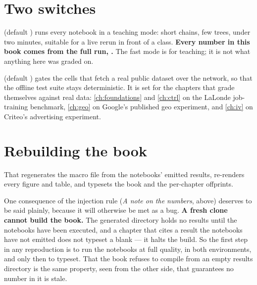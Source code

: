 \section*{Two switches}

 (default ) runs every notebook in a teaching mode: short chains, few
trees, under two minutes, suitable for a live rerun in front of a class. \textbf{Every number in
this book comes from the full run, .} The fast mode is for teaching; it is not
what anything here was graded on.

 (default ) gates the cells that fetch a real public dataset over the
network, so that the offline test suite stays deterministic. It is set for the chapters that grade
themselves against real data: \cref{ch:foundations} and \cref{ch:ctrl} on the LaLonde job-training
benchmark, \cref{ch:geo} on Google's published geo experiment, and \cref{ch:iv} on Criteo's
advertising experiment.

\section*{Rebuilding the book}

\begin{quote}
\end{quote}

That regenerates the macro file from the notebooks' emitted results, re-renders every figure and
table, and typesets the book and the per-chapter offprints.

One consequence of the injection rule (\emph{A note on the numbers}, above) deserves to be said
plainly, because it will otherwise be met as a bug. \textbf{A fresh clone cannot build the book.}
The generated directory holds no results until the notebooks have been executed, and a chapter that
cites a result the notebooks have not emitted does not typeset a blank --- it halts the build. So
the first step in any reproduction is to run the notebooks at full quality, in both environments,
and only then to typeset. That the book refuses to compile from an empty results directory is the
same property, seen from the other side, that guarantees no number in it is stale.
